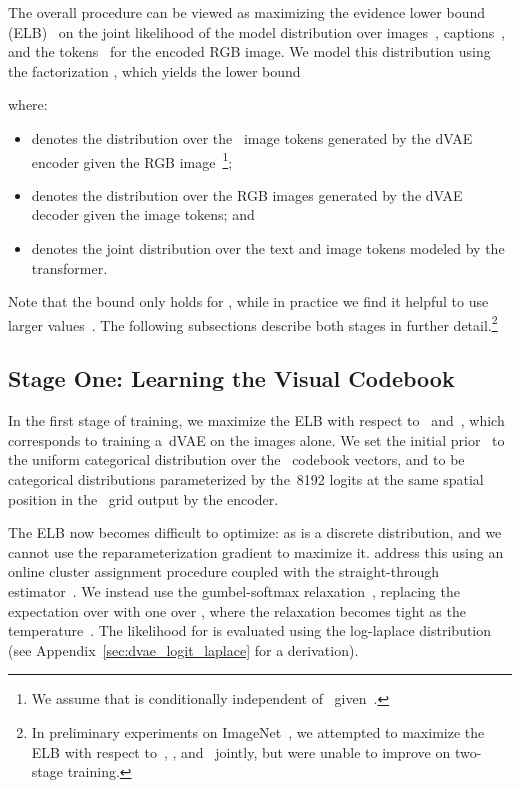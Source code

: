 \documentclass{article}
\begin{document}
The overall procedure can be viewed as maximizing the evidence lower bound (ELB)~\cite{kingma2013auto,rezende2014stochastic} on the joint likelihood of the model distribution over images~, captions~, and the tokens~ for the encoded RGB image. We model this distribution using the factorization , which yields the lower bound

where:
\begin{itemize}
    \item  denotes the distribution over the~ image tokens generated by the dVAE encoder given the RGB image~\footnote{We assume that  is conditionally independent of~ given~.};
    \item  denotes the distribution over the RGB images generated by the dVAE decoder given the image tokens; and
    \item  denotes the joint distribution over the text and image tokens modeled by the transformer.
\end{itemize}
Note that the bound only holds for , while in practice we find it helpful to use larger values~\cite{higgins2016beta}. The following subsections describe both stages in further detail.\footnote{In preliminary experiments on ImageNet~\cite{deng2009imagenet}, we attempted to maximize the ELB with respect to~, , and~ jointly, but were unable to improve on two-stage training.}

\subsection{Stage One: Learning the Visual Codebook}

In the first stage of training, we maximize the ELB with respect to~ and~, which corresponds to training a~dVAE on the images alone. We set the initial prior~ to the uniform categorical distribution over the~ codebook vectors, and  to be categorical distributions parameterized by the~\num{8192} logits at the same spatial position in the~ grid output by the encoder.

The ELB now becomes difficult to optimize: as  is a discrete distribution, and we cannot use the reparameterization gradient to maximize it. \citet{oord2017neural,razavi2019generating} address this using an online cluster assignment procedure coupled with the straight-through estimator~\cite{bengio2013estimating}. We instead use the gumbel-softmax relaxation~\cite{jang2016categorical,maddison2016concrete}, replacing the expectation over  with one over , where the relaxation becomes tight as the temperature~. The likelihood for  is evaluated using the log-laplace distribution (see Appendix~\ref{sec:dvae_logit_laplace} for a derivation).
\end{document}
